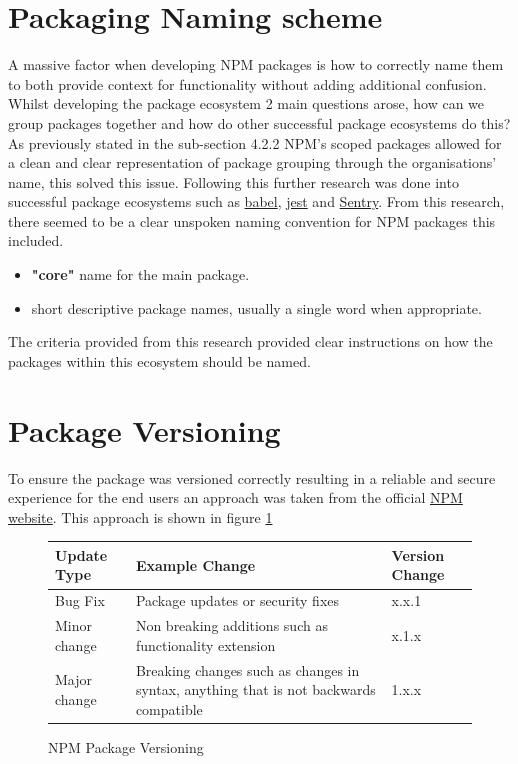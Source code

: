 \documentclass{l4proj}
\begin{document}
\section{Packaging Naming scheme}
A massive factor when developing NPM packages is how to correctly name them to both provide context for functionality without adding additional confusion. Whilst developing the package ecosystem 2 main questions arose, how can we group packages together and how do other successful package ecosystems do this? As previously stated in the sub-section 4.2.2 NPM's scoped packages allowed for a clean and clear representation of package grouping through the organisations' name, this solved this issue. Following this further research was done into successful package ecosystems such as \href{https://babeljs.io/}{babel}, \href{https://jestjs.io/}{jest} and \href{https://sentry.io/welcome/}{Sentry}. From this research, there seemed to be a clear unspoken naming convention for NPM packages this included.
\begin{itemize}
    \item \textbf{"core"} name for the main package.
    \item short descriptive package names, usually a single word when appropriate.
\end{itemize}

The criteria provided from this research provided clear instructions on how the packages within this ecosystem should be named.

\section{Package Versioning}
To ensure the package was versioned correctly resulting in a reliable and secure experience for the end users an approach was taken from the official \href{https://docs.npmjs.com/about-semantic-versioning
}{NPM website}. This approach is shown in figure \ref{fig:NPM-versioning}

\begin{figure}[!ht]
    
\begin{center}
\begin{tabular}{|p{2.25cm}|p{7.25cm}|p{3.25cm}|}
 \hline
 \textbf{Update Type} & \textbf{Example Change} & \textbf{Version Change} \\
 \hline
 \hline
Bug Fix & Package updates or security fixes  &  x.x.1  \\
 \hline
Minor change & Non breaking additions such as functionality extension  &  x.1.x  \\
 \hline
Major change & Breaking changes such as changes in syntax, anything that is not backwards compatible  &  1.x.x  \\
 \hline
\end{tabular}
\end{center} 
    \caption{NPM Package Versioning}
    \label{fig:NPM-versioning}
\end{figure}
\end{document}

